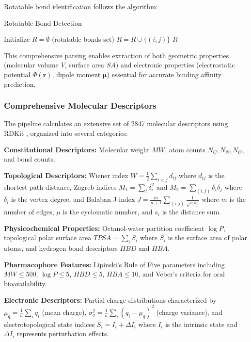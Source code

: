 \documentclass[preprint, 10pt]{elsarticle}
\begin{document}
Rotatable bond identification follows the algorithm:
\begin{algorithm}
\caption{Rotatable Bond Detection}
\begin{algorithmic}
\STATE Initialize $R = \emptyset$ (rotatable bonds set)
            \STATE $R = R \cup \{(i,j)\}$
        \ENDIF
    \ENDIF
\ENDFOR
\RETURN $R$
\end{algorithmic}
\end{algorithm}

This comprehensive parsing enables extraction of both geometric properties (molecular volume $V$, surface area $SA$) and electronic properties (electrostatic potential $\Phi(\mathbf{r})$, dipole moment $\boldsymbol{\mu}$) essential for accurate binding affinity prediction.

\subsubsection{Comprehensive Molecular Descriptors}
The pipeline calculates an extensive set of 2847 molecular descriptors using RDKit \cite{landrum2013rdkit}, organized into several categories:

\textbf{Constitutional Descriptors:} Molecular weight $MW$, atom counts $N_C, N_N, N_O$, and bond counts.

\textbf{Topological Descriptors:} Wiener index $W = \frac{1}{2}\sum_{i<j} d_{ij}$ where $d_{ij}$ is the shortest path distance, Zagreb indices $M_1 = \sum_i \delta_i^2$ and $M_2 = \sum_{(i,j)} \delta_i \delta_j$ where $\delta_i$ is the vertex degree, and Balaban J index $J = \frac{m}{\mu + 1} \sum_{(i,j)} \frac{1}{\sqrt{s_i s_j}}$ where $m$ is the number of edges, $\mu$ is the cyclomatic number, and $s_i$ is the distance sum.

\textbf{Physicochemical Properties:} Octanol-water partition coefficient $\log P$, topological polar surface area $TPSA = \sum_i S_i$ where $S_i$ is the surface area of polar atoms, and hydrogen bond descriptors $HBD$ and $HBA$.

\textbf{Pharmacophore Features:} Lipinski's Rule of Five parameters including $MW \leq 500$, $\log P \leq 5$, $HBD \leq 5$, $HBA \leq 10$, and Veber's criteria for oral bioavailability.

\textbf{Electronic Descriptors:} Partial charge distributions characterized by $\mu_q = \frac{1}{n}\sum_i q_i$ (mean charge), $\sigma_q^2 = \frac{1}{n}\sum_i (q_i - \mu_q)^2$ (charge variance), and electrotopological state indices $S_i = I_i + \Delta I_i$ where $I_i$ is the intrinsic state and $\Delta I_i$ represents perturbation effects.
\end{document}
